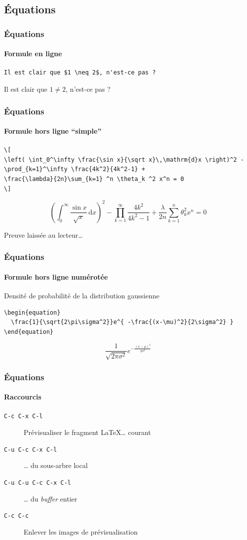 \documentclass[presentation,t,hideothersubsections]{beamer}
\begin{document}
\subsection{Équations}
\label{sec-3-1}
\begin{frame}[fragile]
\frametitle{Équations}
\framesubtitle{Formule en ligne}
\label{sec-3-1-1}



\lstset{language=org}
\begin{lstlisting}
Il est clair que $1 \neq 2$, n'est-ce pas ?
\end{lstlisting}

Il est clair que $1 \neq 2$, n'est-ce pas ?
\end{frame}
\begin{frame}[fragile]
\frametitle{Équations}
\framesubtitle{Formule hors ligne ``simple''}
\label{sec-3-1-2}



\lstset{language=org}
\begin{lstlisting}
\[
\left( \int_0^\infty \frac{\sin x}{\sqrt x}\,\mathrm{d}x \right)^2 -
\prod_{k=1}^\infty \frac{4k^2}{4k^2-1} +
\frac{\lambda}{2n}\sum_{k=1} ^n \theta_k ^2 x^n = 0
\]
\end{lstlisting}

\[
\left( \int_0^\infty \frac{\sin x}{\sqrt x}\,\mathrm{d}x \right)^2 -
\prod_{k=1}^\infty \frac{4k^2}{4k^2-1} +
\frac{\lambda}{2n}\sum_{k=1} ^n \theta_k ^2 x^n = 0
\]

Preuve laissée au lecteur\ldots{}
\end{frame}
\begin{frame}[fragile]
\frametitle{Équations}
\framesubtitle{Formule hors ligne numérotée}
\label{sec-3-1-3}


Densité de probabilité de la distribution gaussienne


\lstset{language=org}
\begin{lstlisting}
\begin{equation}
  \frac{1}{\sqrt{2\pi\sigma^2}}e^{ -\frac{(x-\mu)^2}{2\sigma^2} }
\end{equation}
\end{lstlisting}

\begin{equation}
  \frac{1}{\sqrt{2\pi\sigma^2}}e^{ -\frac{(x-\mu)^2}{2\sigma^2} }
\end{equation}
\end{frame}
\begin{frame}
\frametitle{Équations}
\framesubtitle{Raccourcis}
\label{sec-3-1-4}


\begin{description}
\item[\texttt{C-c C-x C-l}] Prévisualiser le fragment \LaTeX{}\ldots{} courant
\item[\texttt{C-u C-c C-x C-l}] \ldots{} du sous-arbre local
\item[\texttt{C-u C-u C-c C-x C-l}] \ldots{} du \emph{buffer} entier
\item[\texttt{C-c C-c}] Enlever les images de prévisualisation
\end{description}
\end{frame}
\end{document}

